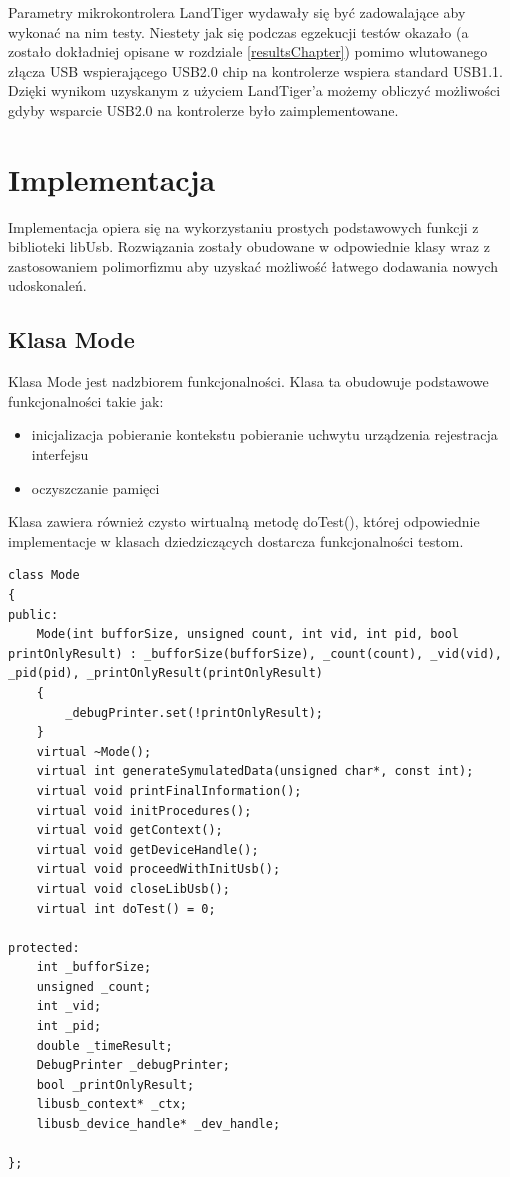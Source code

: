 \documentclass{BscUS}
\begin{document}
Parametry mikrokontrolera LandTiger wydawały się być zadowalające aby wykonać na nim testy. Niestety jak się podczas egzekucji testów okazało (a zostało dokładniej opisane w rozdziale \ref{resultsChapter}) pomimo wlutowanego złącza USB wspierającego USB2.0 chip na kontrolerze wspiera standard USB1.1. Dzięki wynikom uzyskanym z użyciem LandTiger'a możemy obliczyć możliwości gdyby wsparcie USB2.0 na kontrolerze było zaimplementowane.


\chapter{Implementacja}
\label{implementationChapter}
Implementacja opiera się na wykorzystaniu prostych podstawowych funkcji z biblioteki libUsb. Rozwiązania zostały obudowane w odpowiednie klasy wraz z zastosowaniem polimorfizmu aby uzyskać możliwość łatwego dodawania nowych udoskonaleń.

\section{Klasa Mode}
Klasa Mode jest nadzbiorem funkcjonalności. Klasa ta obudowuje podstawowe funkcjonalności takie jak:
\begin{itemize}
\item inicjalizacja
\subitem pobieranie kontekstu
\subitem pobieranie uchwytu urządzenia
\subitem rejestracja interfejsu
\item oczyszczanie pamięci
\end{itemize}
Klasa zawiera również czysto wirtualną metodę doTest(), której odpowiednie implementacje w klasach dziedziczących dostarcza funkcjonalności testom.
\begin{lstlisting}[caption={Deklaracja klasy Mode},label={lst:CMode}]
class Mode
{
public:
	Mode(int bufforSize, unsigned count, int vid, int pid, bool printOnlyResult) : _bufforSize(bufforSize), _count(count), _vid(vid), _pid(pid), _printOnlyResult(printOnlyResult)
	{
		_debugPrinter.set(!printOnlyResult);
	}
	virtual ~Mode();
	virtual int generateSymulatedData(unsigned char*, const int);
	virtual void printFinalInformation();
	virtual void initProcedures();
	virtual void getContext();
	virtual void getDeviceHandle();
	virtual void proceedWithInitUsb();
	virtual void closeLibUsb();
	virtual int doTest() = 0;
	
protected:
	int _bufforSize;
	unsigned _count;
	int _vid;
	int _pid;
	double _timeResult;
	DebugPrinter _debugPrinter;
	bool _printOnlyResult;
	libusb_context* _ctx;
	libusb_device_handle* _dev_handle;

};
\end{lstlisting}
\end{document}
